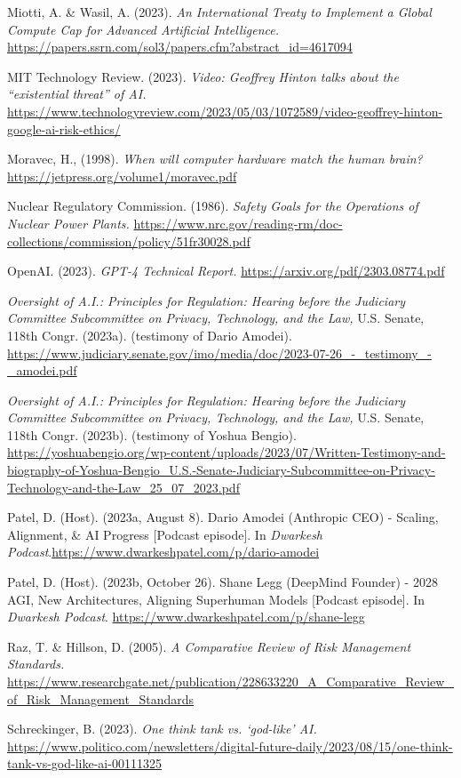 \documentclass[12pt,a4paper]{article}
\begin{document}
Miotti, A. \& Wasil, A. (2023). \textit{An International Treaty to Implement a Global Compute Cap for Advanced Artificial Intelligence.} \url{https://papers.ssrn.com/sol3/papers.cfm?abstract_id=4617094}

MIT Technology Review. (2023). \textit{Video: Geoffrey Hinton talks about the “existential threat” of AI.} \url{https://www.technologyreview.com/2023/05/03/1072589/video-geoffrey-hinton-google-ai-risk-ethics/}

Moravec, H., (1998). \textit{When will computer hardware match the human brain?} \url{https://jetpress.org/volume1/moravec.pdf}

Nuclear Regulatory Commission. (1986). \textit{Safety Goals for the Operations of Nuclear Power Plants.} \url{https://www.nrc.gov/reading-rm/doc-collections/commission/policy/51fr30028.pdf}

OpenAI. (2023). \textit{GPT-4 Technical Report.} \url{https://arxiv.org/pdf/2303.08774.pdf}

\textit{Oversight of A.I.: Principles for Regulation: Hearing before the Judiciary Committee Subcommittee on Privacy, Technology, and the Law,} U.S. Senate, 118th Congr. (2023a). (testimony of Dario Amodei). \url{https://www.judiciary.senate.gov/imo/media/doc/2023-07-26_-_testimony_-_amodei.pdf}

\textit{Oversight of A.I.: Principles for Regulation: Hearing before the Judiciary Committee Subcommittee on Privacy, Technology, and the Law,} U.S. Senate, 118th Congr. (2023b). (testimony of Yoshua Bengio). \url{https://yoshuabengio.org/wp-content/uploads/2023/07/Written-Testimony-and-biography-of-Yoshua-Bengio_U.S.-Senate-Judiciary-Subcommittee-on-Privacy-Technology-and-the-Law_25_07_2023.pdf}

Patel, D. (Host). (2023a, August 8). Dario Amodei (Anthropic CEO) - Scaling, Alignment, \& AI Progress [Podcast episode]. In \textit{Dwarkesh Podcast}.\url{https://www.dwarkeshpatel.com/p/dario-amodei}

Patel, D. (Host). (2023b, October 26). Shane Legg (DeepMind Founder) - 2028 AGI, New Architectures, Aligning Superhuman Models [Podcast episode]. In \textit{Dwarkesh Podcast}. \url{https://www.dwarkeshpatel.com/p/shane-legg}

Raz, T. \& Hillson, D. (2005). \textit{A Comparative Review of Risk Management Standards.} \url{https://www.researchgate.net/publication/228633220_A_Comparative_Review_of_Risk_Management_Standards}

Schreckinger, B. (2023). \textit{One think tank vs. ‘god-like’ AI.} \url{https://www.politico.com/newsletters/digital-future-daily/2023/08/15/one-think-tank-vs-god-like-ai-00111325}
\end{document}
